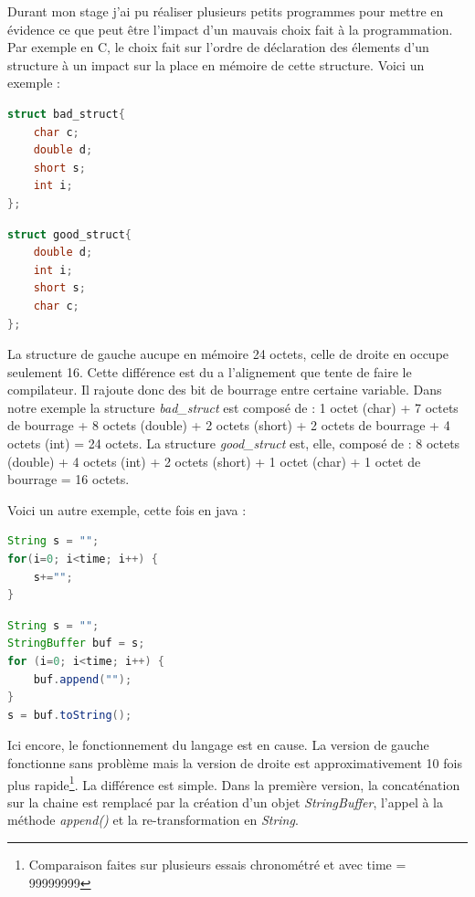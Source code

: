 \documentclass[a4paper, 11pt]{report}
\begin{document}
Durant mon stage j'ai pu réaliser plusieurs petits programmes pour mettre en évidence ce que peut être l'impact d'un mauvais choix fait à la programmation. Par exemple en C, le choix fait sur l'ordre de déclaration des élements d'un structure à un impact sur la place en mémoire de cette structure. Voici un exemple :

\begin{multicols}{2}
\begin{lstlisting}[language=C]
struct bad_struct{
    char c;
    double d;
    short s;
    int i;
};
\end{lstlisting}
\columnbreak
\begin{lstlisting}[language=C]
struct good_struct{
    double d;
    int i;
    short s;
    char c;
};
\end{lstlisting}
\end{multicols}

La structure de gauche aucupe en mémoire 24 octets, celle de droite en occupe seulement 16. Cette différence est du a l'alignement que tente de faire le compilateur. Il rajoute donc des bit de bourrage entre certaine variable. Dans notre exemple la structure \textit{bad\_struct} est composé de : 1 octet (char) + 7 octets de bourrage + 8 octets (double) + 2 octets (short) + 2 octets de bourrage + 4 octets (int) = 24 octets. La structure \textit{good\_struct} est, elle, composé de : 8 octets (double) + 4 octets (int) + 2 octets (short) + 1 octet (char) + 1 octet de bourrage = 16 octets.

Voici un autre exemple, cette fois en java :

\begin{multicols}{2}
\begin{lstlisting}[language=Java]
String s = "";
for(i=0; i<time; i++) {
    s+="";
}
\end{lstlisting}
\columnbreak
\begin{lstlisting}[language=Java]
String s = "";
StringBuffer buf = s;
for (i=0; i<time; i++) {
    buf.append("");
}
s = buf.toString();
\end{lstlisting}
\end{multicols}

Ici encore, le fonctionnement du langage est en cause. La version de gauche fonctionne sans problème mais la version de droite est approximativement 10 fois plus rapide\footnote{Comparaison faites sur plusieurs essais chronométré et avec time = 99999999}. La différence est simple. Dans la première version, la concaténation sur la chaine est remplacé par la création d'un objet \textit{StringBuffer}, l'appel à la méthode \textit{append()} et la re-transformation en \textit{String}.
\end{document}
